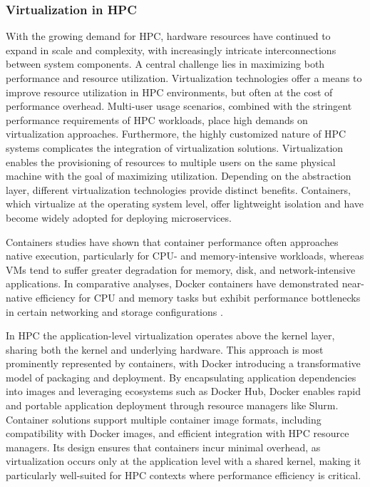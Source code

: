 \subsubsection{Virtualization in HPC}
\label{sec:background_hpc_virtualization}
With the growing demand for HPC, hardware resources have continued to expand in scale and complexity, with increasingly intricate interconnections between system components. A central challenge lies in maximizing both performance and resource utilization. Virtualization technologies offer a means to improve resource utilization in HPC environments, but often at the cost of performance overhead. Multi-user usage scenarios, combined with the stringent performance requirements of HPC workloads, place high demands on virtualization approaches. Furthermore, the highly customized nature of HPC systems complicates the integration of virtualization solutions.
Virtualization enables the provisioning of resources to multiple users on the same physical machine with the goal of maximizing utilization. Depending on the abstraction layer, different virtualization technologies provide distinct benefits. Containers, which virtualize at the operating system level, offer lightweight isolation and have become widely adopted for deploying microservices.

Containers studies have shown that container performance often approaches native execution, particularly for CPU- and memory-intensive workloads, whereas VMs tend to suffer greater degradation for memory, disk, and network-intensive applications. In comparative analyses, Docker containers have demonstrated near-native efficiency for CPU and memory tasks but exhibit performance bottlenecks in certain networking and storage configurations \cite{8397647}.

In HPC the application-level virtualization operates above the kernel layer, sharing both the kernel and underlying hardware. This approach is most prominently represented by containers, with Docker introducing a transformative model of packaging and deployment. By encapsulating application dependencies into images and leveraging ecosystems such as Docker Hub, Docker enables rapid and portable application deployment through resource managers like Slurm.
Container solutions support multiple container image formats, including compatibility with Docker images, and efficient integration with HPC resource managers. Its design ensures that containers incur minimal overhead, as virtualization occurs only at the application level with a shared kernel, making it particularly well-suited for HPC contexts where performance efficiency is critical.

